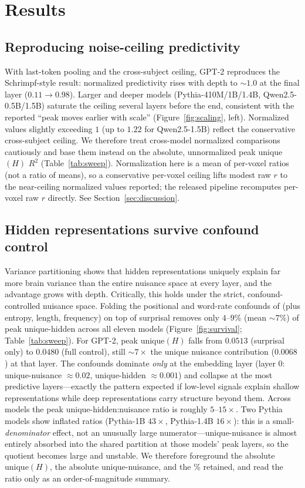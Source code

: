 \documentclass{article}
\begin{document}
\section{Results}
\label{sec:results}

\subsection{Reproducing noise-ceiling predictivity}
\label{sec:repro}
With last-token pooling and the cross-subject ceiling, GPT-2 reproduces the Schrimpf-style
result: normalized predictivity rises with depth to $\sim$$1.0$ at the final layer
($0.11 \rightarrow 0.98$). Larger and deeper models (Pythia-410M/1B/1.4B, Qwen2.5-0.5B/1.5B)
saturate the ceiling several layers before the end, consistent with the reported ``peak moves
earlier with scale'' (Figure~\ref{fig:scaling}, left). Normalized values slightly exceeding $1$
(up to $1.22$ for Qwen2.5-1.5B) reflect the conservative cross-subject ceiling. We therefore
treat cross-model normalized comparisons cautiously and base them instead on the absolute,
unnormalized peak unique$(H)$ $R^2$ (Table~\ref{tab:sweep}). Normalization here is a mean of
per-voxel ratios (not a ratio of means), so a conservative per-voxel ceiling lifts modest raw $r$
to the near-ceiling normalized values reported; the released pipeline recomputes per-voxel raw
$r$ directly. See Section~\ref{sec:discussion}.

\subsection{Hidden representations survive confound control}
\label{sec:core}
Variance partitioning shows that hidden representations uniquely explain far more brain variance
than the entire nuisance space at every layer, and the advantage grows with depth. Critically,
this holds under the strict, confound-controlled nuisance space. Folding the positional and
word-rate confounds of \citet{feghhi2024} (plus entropy, length, frequency) on top of surprisal
removes only $4$--$9\%$ (mean $\sim$$7\%$) of peak unique-hidden across all eleven models
(Figure~\ref{fig:survival}; Table~\ref{tab:sweep}). For GPT-2, peak $\text{unique}(H)$ falls
from $0.0513$ (surprisal only) to $0.0480$ (full control), still $\sim$$7\times$ the unique
nuisance contribution ($0.0068$) at that layer. The confounds dominate \emph{only} at the
embedding layer (layer $0$: unique-nuisance $\approx 0.02$, unique-hidden $\approx 0.001$) and
collapse at the most predictive layers---exactly the pattern expected if low-level signals
explain shallow representations while deep representations carry structure beyond them. Across
models the peak unique-hidden:nuisance ratio is roughly $5$--$15\times$. Two Pythia models show
inflated ratios (Pythia-1B $43\times$, Pythia-1.4B $16\times$): this is a small-\emph{denominator}
effect, not an unusually large numerator---unique-nuisance is almost entirely absorbed into the
shared partition at those models' peak layers, so the quotient becomes large and unstable. We
therefore foreground the absolute unique$(H)$, the absolute unique-nuisance, and the
\% retained, and read the ratio only as an order-of-magnitude summary.
\end{document}
